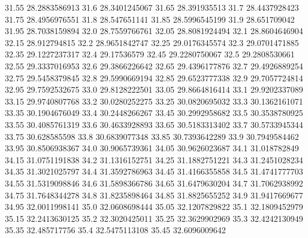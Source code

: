           31.55    28.2883586913
           31.6    28.3401245067
          31.65     28.391935513
           31.7    28.4437928423
          31.75    28.4956976551
           31.8     28.547651141
          31.85    28.5996545199
           31.9     28.651709042
          31.95    28.7038159894
           32.0    28.7559766761
          32.05    28.8081924494
           32.1    28.8604646904
          32.15     28.912794815
           32.2    28.9651842747
          32.25    29.0176345574
           32.3    29.0701471885
          32.35    29.1227237317
           32.4      29.17536579
          32.45    29.2280750067
           32.5    29.2808530661
          32.55    29.3337016953
           32.6    29.3866226642
          32.65    29.4396177876
           32.7    29.4926889254
          32.75    29.5458379845
           32.8    29.5990669194
          32.85    29.6523777338
           32.9    29.7057724814
          32.95    29.7592532675
           33.0    29.8128222501
          33.05    29.8664816414
           33.1    29.9202337089
          33.15    29.9740807768
           33.2    30.0280252275
          33.25    30.0820695032
           33.3    30.1362161071
          33.35    30.1904676049
           33.4    30.2448266267
          33.45    30.2992958682
           33.5    30.3538780925
          33.55    30.4085761319
           33.6    30.4633928893
          33.65    30.5183313402
           33.7    30.5733945344
          33.75     30.628585598
           33.8    30.6839077348
          33.85    30.7393642289
           33.9    30.7949584462
          33.95    30.8506938367
           34.0    30.9065739361
          34.05    30.9626023687
           34.1     31.018782849
          34.15    31.0751191838
           34.2    31.1316152751
          34.25    31.1882751221
           34.3    31.2451028234
          34.35    31.3021025797
           34.4    31.3592786963
          34.45    31.4166355858
           34.5    31.4741777703
          34.55    31.5319098846
           34.6    31.5898366786
          34.65    31.6479630204
           34.7    31.7062938992
          34.75    31.7648344278
           34.8    31.8235898464
          34.85    31.8825655252
           34.9    31.9417669677
          34.95    32.0011998141
           35.0    32.0608698444
          35.05    32.1207829822
           35.1    32.1809452979
          35.15    32.2413630125
           35.2    32.3020425011
          35.25    32.3629902969
           35.3    32.4242130949
          35.35     32.485717756
           35.4    32.5475113108
          35.45    32.6096009642
